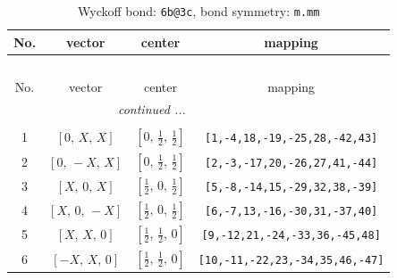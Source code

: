 \documentclass[fleqn,8pt]{jsarticle}
\begin{document}
\renewcommand{\arraystretch}{1.2}
\begin{longtable}{cccc}
\caption{Wyckoff bond: {\tt 6b@3c}, bond symmetry: {\tt m.mm}}
 \\
 \hline \hline
No. & vector & center & mapping \\ \hline \endfirsthead

\multicolumn{3}{l}{\tablename\ \thetable{}} \\
 \hline \hline
No. & vector & center & mapping \\ \hline \endhead

 \hline \hline
\multicolumn{3}{r}{\footnotesize\it continued ...} \\ \endfoot

 \hline \hline
\multicolumn{3}{r}{} \\ \endlastfoot

1 & $\left[ 0,\, X,\, X \right]$ & $\left[ 0,\, \frac{1}{2},\, \frac{1}{2} \right]$ & {\tt [1,-4,18,-19,-25,28,-42,43]} \\ \hline
2 & $\left[ 0,\, - X,\, X \right]$ & $\left[ 0,\, \frac{1}{2},\, \frac{1}{2} \right]$ & {\tt [2,-3,-17,20,-26,27,41,-44]} \\ \hline
3 & $\left[ X,\, 0,\, X \right]$ & $\left[ \frac{1}{2},\, 0,\, \frac{1}{2} \right]$ & {\tt [5,-8,-14,15,-29,32,38,-39]} \\ \hline
4 & $\left[ X,\, 0,\, - X \right]$ & $\left[ \frac{1}{2},\, 0,\, \frac{1}{2} \right]$ & {\tt [6,-7,13,-16,-30,31,-37,40]} \\ \hline
5 & $\left[ X,\, X,\, 0 \right]$ & $\left[ \frac{1}{2},\, \frac{1}{2},\, 0 \right]$ & {\tt [9,-12,21,-24,-33,36,-45,48]} \\ \hline
6 & $\left[ - X,\, X,\, 0 \right]$ & $\left[ \frac{1}{2},\, \frac{1}{2},\, 0 \right]$ & {\tt [10,-11,-22,23,-34,35,46,-47]} \\
\end{longtable}
\renewcommand{\arraystretch}{1.2}
\end{document}
